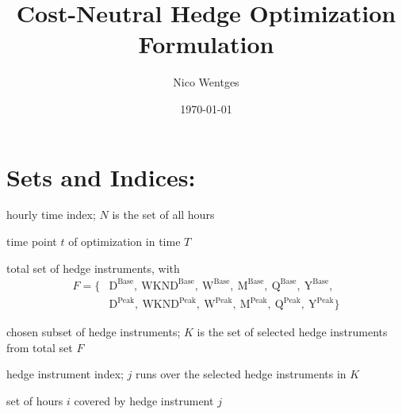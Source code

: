 \documentclass[11pt,leqno]{article}
\title{Cost-Neutral Hedge Optimization Formulation}
\author{Nico Wentges}
\date{\today}
\begin{document}
\maketitle

\section*{Sets and Indices:}
\begin{description}[widest={$K \subseteq F:$}]
  \item[$\bullet\; i \in N:$] hourly time index; $N$ is the set of all hours
  \item[$\bullet\; t \in T:$] time point $t$ of optimization in time $T$
  \item[$\bullet\; F:$] total set of hedge instruments, with
    \[
      \begin{aligned}
        F = \{&\mathrm{D^{Base}},\ \mathrm{WKND^{Base}},\ \mathrm{W^{Base}},\ \mathrm{M^{Base}},\ \mathrm{Q^{Base}},\ \mathrm{Y^{Base}},\\
            &\mathrm{D^{Peak}},\ \mathrm{WKND^{Peak}},\ \mathrm{W^{Peak}},\ \mathrm{M^{Peak}},\ \mathrm{Q^{Peak}},\ \mathrm{Y^{Peak}}\}
      \end{aligned}
    \]
  \item[$\bullet\; K \subseteq F:$] chosen subset of hedge instruments; $K$ is the set of selected hedge
    instruments from total set $F$
  \item[$\bullet\; j \in K:$] hedge instrument index; $j$ runs over the selected hedge instruments in
    $K$
  \item[$\bullet\; I^{j}:$] set of hours $i$ covered by hedge instrument
    $j$
\end{description}
  
\end{document}
